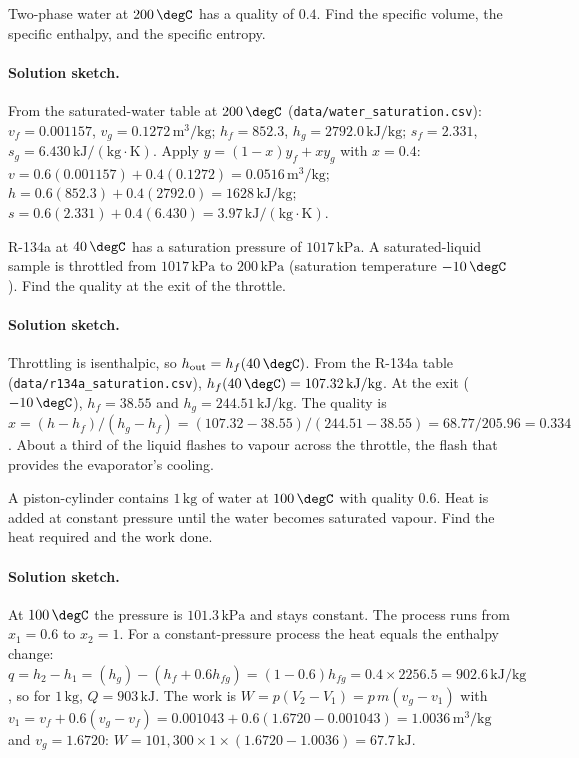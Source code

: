 \begin{exercise}
Two-phase water at $200\,\degC$ has a quality of $0.4$. Find the
specific volume, the specific enthalpy, and the specific entropy.

\paragraph{Solution sketch.} From the saturated-water table at
$200\,\degC$ (\texttt{data/water\_saturation.csv}): $v_f = 0.001157$,
$v_g = 0.1272\,\text{m}^3/\text{kg}$; $h_f = 852.3$, $h_g = 2792.0\,
\text{kJ}/\text{kg}$; $s_f = 2.331$, $s_g = 6.430\,\text{kJ}/(\text{kg}
\cdot\si{\kelvin})$. Apply $y = (1-x)y_f + x y_g$ with $x = 0.4$:
$v = 0.6(0.001157) + 0.4(0.1272) = 0.0516\,\text{m}^3/\text{kg}$;
$h = 0.6(852.3) + 0.4(2792.0) = 1628\,\text{kJ}/\text{kg}$;
$s = 0.6(2.331) + 0.4(6.430) = 3.97\,\text{kJ}/(\text{kg}\cdot
\si{\kelvin})$.
\end{exercise}

\begin{exercise}
R-134a at $40\,\degC$ has a saturation pressure of $1017\,\text{kPa}$.
A saturated-liquid sample is throttled from $1017\,\text{kPa}$ to
$200\,\text{kPa}$ (saturation temperature $-10\,\degC$). Find the
quality at the exit of the throttle.

\paragraph{Solution sketch.} Throttling is isenthalpic, so
$h_{\text{out}} = h_f(40\,\degC)$. From the R-134a table
(\texttt{data/r134a\_saturation.csv}), $h_f(40\,\degC) = 107.32\,
\text{kJ}/\text{kg}$. At the exit ($-10\,\degC$), $h_f = 38.55$ and
$h_g = 244.51\,\text{kJ}/\text{kg}$. The quality is $x = (h - h_f)/(h_g -
h_f) = (107.32 - 38.55)/(244.51 - 38.55) = 68.77/205.96 = 0.334$. About a
third of the liquid flashes to vapour across the throttle, the flash that
provides the evaporator's cooling.
\end{exercise}

\begin{exercise}
A piston-cylinder contains $1\,\text{kg}$ of water at $100\,\degC$
with quality $0.6$. Heat is added at constant pressure until the
water becomes saturated vapour. Find the heat required and the work
done.

\paragraph{Solution sketch.} At $100\,\degC$ the pressure is
$101.3\,\text{kPa}$ and stays constant. The process runs from $x_1 = 0.6$
to $x_2 = 1$. For a constant-pressure process the heat equals the
enthalpy change: $q = h_2 - h_1 = (h_g) - (h_f + 0.6 h_{fg}) = (1 -
0.6)h_{fg} = 0.4\times 2256.5 = 902.6\,\text{kJ}/\text{kg}$, so for
$1\,\text{kg}$, $Q = 903\,\text{kJ}$. The work is $W = p(V_2 - V_1) =
p\,m(v_g - v_1)$ with $v_1 = v_f + 0.6(v_g - v_f) = 0.001043 +
0.6(1.6720 - 0.001043) = 1.0036\,\text{m}^3/\text{kg}$ and $v_g = 1.6720$:
$W = 101{,}300\times 1\times(1.6720 - 1.0036) = 67.7\,\text{kJ}$.
\end{exercise}

